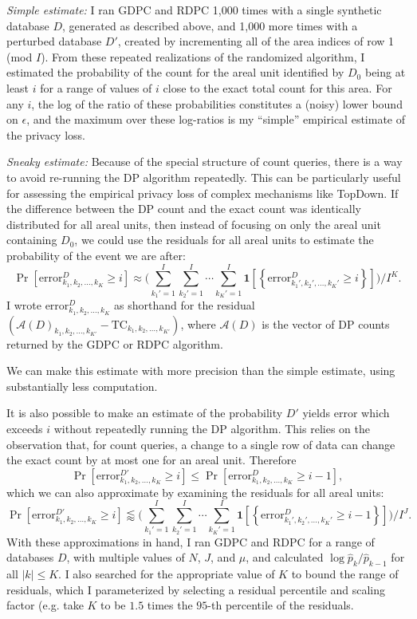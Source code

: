 \documentclass{article}
\begin{document}
\emph{Simple estimate:} I ran GDPC and RDPC 1,000 times with a single synthetic database $D$, generated as described above, and 1,000 more times with a perturbed database $D'$, created by incrementing all of the area indices of row 1 (mod $I$). From these repeated realizations of the randomized algorithm, I estimated the probability of the count for the areal unit identified by $D_0$ being at least $i$ for a range of values of $i$ close to the exact total count for this area.  For any $i$, the log of the ratio of these probabilities constitutes a (noisy) lower bound on $\epsilon$, and the maximum over these log-ratios is my ``simple'' empirical estimate of the privacy loss.

\emph{Sneaky estimate:} Because of the special structure of count queries, there is a way to avoid re-running the DP algorithm repeatedly.  This can be particularly useful for assessing the empirical privacy loss of complex mechanisms like TopDown. If the difference between the DP count and the exact count was identically distributed for all areal units, then instead of focusing on only the areal unit containing $D_0$, we could use the residuals for all areal units to estimate the probability of the event we are after:
$$\Pr\left[\mathrm{error}_{k_1, k_2, \ldots, k_{K}}^D
\geq i\right]
\approx
\bigg(\sum_{k_1'=1}^I\sum_{k_2'=1}^I\cdots\sum_{k_K' = 1}^I \mathbf{1}[\left\{\mathrm{error}_{k_1', k_2', \ldots, k_{K}'}^D
\geq i\right\}]\bigg)\bigg/I^K.
$$
I wrote $\mathrm{error}_{k_1, k_2, \ldots, k_{K}}^D$ as shorthand for the residual $\left(\mathcal{A}(D)_{k_1, k_2, \ldots, k_{K'}}
- \mathrm{TC}_{k_1, k_2, \ldots, k_{K'}}\right)$, where $\mathcal{A}(D)$ is the vector of DP counts returned by the GDPC or RDPC algorithm.

We can make this estimate with more precision than the simple estimate, using substantially less computation.

It is also possible to make an estimate of the probability $D'$ yields error which exceeds $i$ without repeatedly running the DP algorithm.  This relies on the observation that, for count queries, a change to a single row of data can change the exact count by at most one for an areal unit.  Therefore
$$
\Pr\left[\mathrm{error}_{k_1, k_2, \ldots, k_{K}}^{D'}
\geq i\right]
\leq
\Pr\left[\mathrm{error}_{k_1, k_2, \ldots, k_{K}}^{D}
\geq i-1\right],
$$
which we can also approximate by examining the residuals for all areal units:
$$\Pr\left[\mathrm{error}_{k_1, k_2, \ldots, k_{K}}^{D'}
\geq i\right]
\lessapprox 
\bigg(\sum_{k_1'=1}^I\sum_{k_2'=1}^I\cdots\sum_{k_K' = 1}^I \mathbf{1}[\left\{\mathrm{error}_{k_1', k_2', \ldots, k_{K}'}^D
\geq i-1\right\}]\bigg)\bigg/I^J.
$$
With these approximations in hand, I ran GDPC and RDPC for a range of databases $D$, with multiple values of $N$, $J$, and $\mu$, and calculated $\log \hat{p}_k / \hat{p}_{k-1}$ for all $|k| \leq K$.  I also searched for the appropriate value of $K$ to bound the range of residuals, which I parameterized by selecting a residual percentile and scaling factor (e.g. take $K$ to be $1.5$ times the $95$-th percentile of the residuals.
\end{document}
